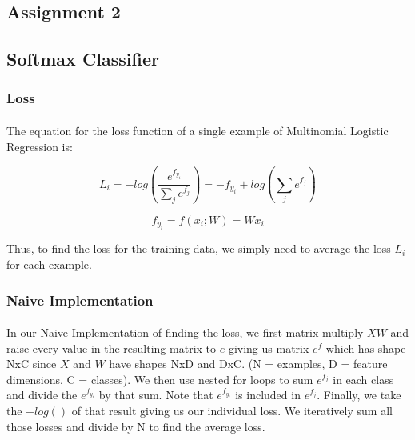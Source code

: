 \documentclass[12pt]{article}
\begin{document}
\begin{center}
\section*{Assignment 2}
\end{center}

\subsection*{Softmax Classifier}
\subsubsection*{Loss}

\paragraph{}
The equation for the loss function of a single example of 
Multinomial Logistic Regression is:  

\begin{equation}
    L_{i} = -log(\frac{e^{f_{y_{i}}}}{\sum_{j} e^{f_j}}) 
    = -f_{y_{i}} + log(\sum_{j} e^{f_{j}})
\end{equation}

\begin{equation}
    f_{y_{i}} = f(x_{i}; W) = Wx_{i}
\end{equation}

\noindent Thus, to find the loss for the training data, we simply need 
to average the loss $L_{i}$ for each example. 

\subsubsection{Naive Implementation}
\paragraph{} 
In our Naive Implementation of finding the loss, we first matrix 
multiply $XW$ and raise every value in the resulting matrix to $e$
giving us matrix $e^{f}$ which has shape NxC since $X$ and $W$ 
have shapes NxD and DxC.
(N = examples, D = feature dimensions, C = classes). We then use 
nested for loops to sum $e^{f_{j}}$ in each class and divide the 
$e^{f_{y_{i}}}$ by that sum. Note that $e^{f_{y_{i}}}$ is included in 
$e^{f_{j}}$. Finally, we take the $-log()$ of that 
result giving us our individual loss. We iteratively sum all those losses 
and divide by N to find the average loss. 
\end{document}
